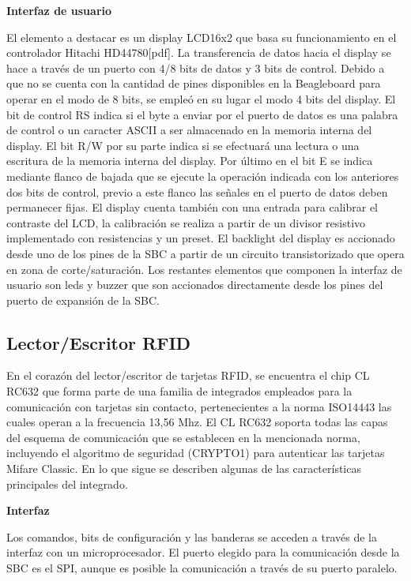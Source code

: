 \bigskip
\bigskip
{\bf{Interfaz de usuario}}

El elemento a destacar es un display LCD16x2 que basa su funcionamiento en el controlador Hitachi HD44780[pdf]. La transferencia de datos hacia el display se hace a través de un puerto con 4/8 bits de datos y 3 bits de control. Debido a que no se cuenta con la cantidad de pines disponibles en la Beagleboard para operar en el modo de 8 bits, se empleó en su lugar el modo 4 bits del display. El bit de control RS indica si el byte a enviar por el puerto de datos es una palabra de control o un caracter ASCII a ser almacenado en la memoria interna del display. El bit R/W por su parte indica si se efectuará una lectura o una escritura de la memoria interna del display. Por último en el bit E se indica mediante flanco de bajada que se ejecute la operación indicada con los anteriores dos bits de control, previo a este flanco las señales en el puerto de datos deben permanecer fijas.
El display cuenta también con una entrada para calibrar el contraste del LCD, la calibración se realiza a partir de un divisor resistivo implementado con resistencias y un preset.
El backlight del display es accionado desde uno de los pines de la SBC a partir de un circuito transistorizado que opera en zona de corte/saturación.
Los restantes elementos que componen la interfaz de usuario son leds y buzzer que son accionados directamente desde los pines del puerto de expansión de la SBC.

\subsection{Lector/Escritor RFID}
En el corazón del lector/escritor de tarjetas RFID, se encuentra el chip CL RC632 que forma parte de una familia de integrados empleados para la comunicación con tarjetas sin contacto, pertenecientes a la norma ISO14443 las cuales operan a la frecuencia 13,56 Mhz.
El CL RC632 soporta todas las capas del esquema de comunicación que se establecen en la mencionada norma, incluyendo el algoritmo de seguridad (CRYPTO1) para autenticar las tarjetas Mifare Classic. En lo que sigue se describen algunas de las características principales del integrado.

\bigskip
{\bf{Interfaz}}

Los comandos, bits de configuración y las banderas se acceden a través de la interfaz con un microprocesador. El puerto elegido para la comunicación desde la SBC es el SPI, aunque es posible la comunicación a través de su puerto paralelo. 

